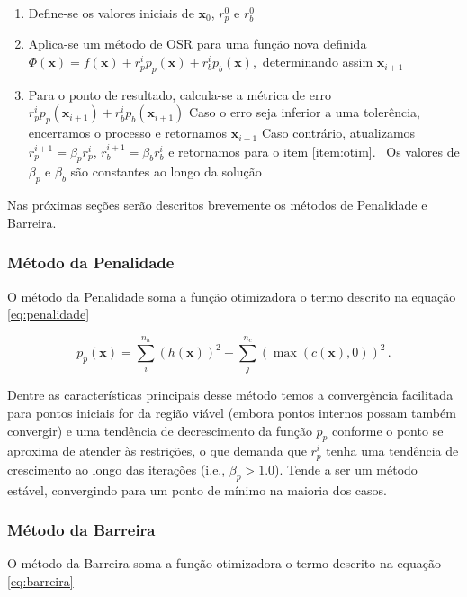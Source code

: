 \documentclass[10pt, a4paper]{article}
\begin{document}
\begin{enumerate}
  \item Define-se os valores iniciais de $\mathbf{x}_0$, $r_p^0$ e $r_b^0$
  \item Aplica-se um método de OSR para uma função nova definida $\Phi(\mathbf{x}) = f(\mathbf{x}) + r_p^i p_p(\mathbf{x}) + r_b^i p_b(\mathbf{x})$,\
   determinando assim $\mathbf{x}_{i+1}$\label{item:otim}
  \item Para o ponto de resultado, calcula-se a métrica de erro $r_p^i p_p(\mathbf{x}_{i+1}) + r_b^i p_b(\mathbf{x}_{i+1})$
    \subitem Caso o erro seja inferior a uma tolerência, encerramos o processo e retornamos $\mathbf{x}_{i+1}$
    \subitem Caso contrário, atualizamos $r_p^{i+1} = \beta_p r_p^i$, $r_b^{i+1} = \beta_b r_b^i$ e retornamos para o item \ref{item:otim}. \
    Os valores de $\beta_p$ e $\beta_b$ são constantes ao longo da solução
\end{enumerate}

Nas próximas seções serão descritos brevemente os métodos de Penalidade e Barreira.

\subsubsection{Método da Penalidade}

O método da Penalidade soma a função otimizadora o termo descrito na equação \ref{eq:penalidade}

\begin{equation}\label{eq:penalidade}
  p_p(\mathbf{x}) = \sum_i^{n_h}(h(\mathbf{x}))^2 + \sum_j^{n_c}(\max{(c(\mathbf{x}),0)})^2\,.
\end{equation}

Dentre as características principais desse método temos a convergência facilitada para pontos iniciais for da região viável 
(embora pontos internos possam também convergir) e uma tendência de decrescimento da função $p_p$ conforme o ponto se aproxima de atender
às restrições, o que demanda que $r_p^i$ tenha uma tendência de crescimento ao longo das iterações (i.e., $\beta_p > 1.0$). Tende a ser um método
estável, convergindo para um ponto de mínimo na maioria dos casos.

\subsubsection{Método da Barreira}

O método da Barreira soma a função otimizadora o termo descrito na equação \ref{eq:barreira}
\end{document}
